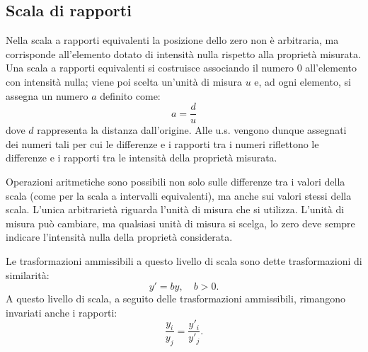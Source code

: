 \subsection{Scala di rapporti}

Nella scala a rapporti equivalenti la posizione dello zero non è arbitraria, ma corrisponde all'elemento dotato di intensità nulla rispetto alla proprietà misurata. Una scala a rapporti equivalenti si costruisce associando il numero 0 all'elemento con intensità nulla; viene  poi scelta un'unità di misura $u$ e, ad ogni elemento, si assegna un numero $a$ definito come:
\[
a = \frac{d}{u}
\]
dove $d$ rappresenta la distanza dall'origine. Alle u.s.  vengono dunque assegnati dei numeri tali per cui le differenze e i rapporti tra i numeri  riflettono le differenze e i rapporti tra le intensità della proprietà misurata.

Operazioni aritmetiche sono  possibili non solo sulle differenze tra i valori della scala (come per la scala a intervalli equivalenti), ma anche sui valori stessi della scala. L'unica arbitrarietà riguarda l'unità di misura che si utilizza. L'unità di misura può cambiare, ma qualsiasi unità di misura si scelga, lo zero deve sempre indicare l'intensità nulla della proprietà considerata.

Le trasformazioni ammissibili a questo livello di scala sono dette trasformazioni di similarità:
\[
    y' = by, \quad b > 0.
\]
A questo livello di scala, a seguito delle trasformazioni ammissibili, rimangono invariati anche i rapporti:
\[
    \frac{y_i}{y_j} = \frac{y'_i}{y'_j}.
\]


